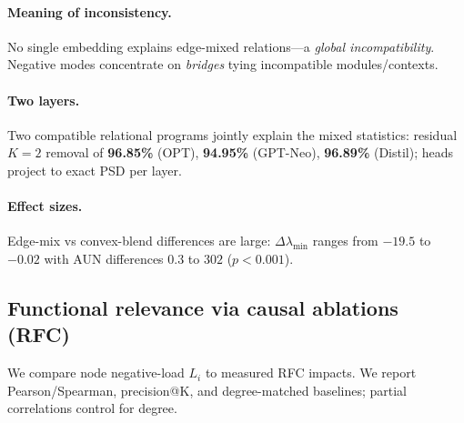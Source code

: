 \documentclass[11pt]{article}
\newcommand{\1}{\mathbf{1}}
\begin{document}
\paragraph{Meaning of inconsistency.} No single embedding explains edge-mixed relations---a \emph{global incompatibility}. Negative modes concentrate on \emph{bridges} tying incompatible modules/contexts.

\paragraph{Two layers.} Two compatible relational programs jointly explain the mixed statistics: residual $K{=}2$ removal of \textbf{96.85\%} (OPT), \textbf{94.95\%} (GPT-Neo), \textbf{96.89\%} (Distil); heads project to exact PSD per layer.

\paragraph{Effect sizes.} Edge-mix vs convex-blend differences are large: $\Delta\lambda_{\min}$ ranges from $-19.5$ to $-0.02$ with AUN differences $0.3$ to $302$ ($p<0.001$).

\subsection{Functional relevance via causal ablations (RFC)}
We compare node negative-load $L_i$ to measured RFC impacts. We report Pearson/Spearman, precision@K, and degree-matched baselines; partial correlations control for degree.
\end{document}
